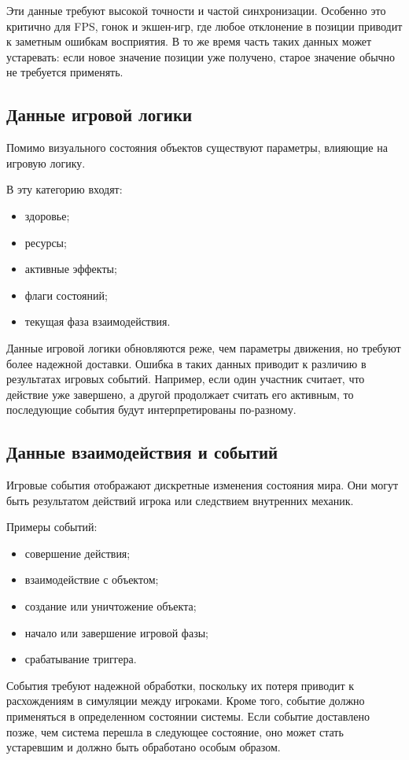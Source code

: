 Эти данные требуют высокой точности и частой синхронизации. Особенно это критично для FPS, гонок и экшен-игр, где любое отклонение в позиции приводит к заметным ошибкам восприятия. В то же время часть таких данных может устаревать: если новое значение позиции уже получено, старое значение обычно не требуется применять.

\subsection{Данные игровой логики}

Помимо визуального состояния объектов существуют параметры, влияющие на игровую логику.

В эту категорию входят:
\begin{itemize}
	\item здоровье;
	\item ресурсы;
	\item активные эффекты;
	\item флаги состояний;
	\item текущая фаза взаимодействия.
\end{itemize}

Данные игровой логики обновляются реже, чем параметры движения, но требуют более надежной доставки. Ошибка в таких данных приводит к различию в результатах игровых событий. Например, если один участник считает, что действие уже завершено, а другой продолжает считать его активным, то последующие события будут интерпретированы по-разному.

\subsection{Данные взаимодействия и событий}

Игровые события отображают дискретные изменения состояния мира. Они могут быть результатом действий игрока или следствием внутренних механик.

Примеры событий:
\begin{itemize}
	\item совершение действия;
	\item взаимодействие с объектом;
	\item создание или уничтожение объекта;
	\item начало или завершение игровой фазы;
	\item срабатывание триггера.
\end{itemize}

События требуют надежной обработки, поскольку их потеря приводит к расхождениям в симуляции между игроками. Кроме того, событие должно применяться в определенном состоянии системы. Если событие доставлено позже, чем система перешла в следующее состояние, оно может стать устаревшим и должно быть обработано особым образом.

